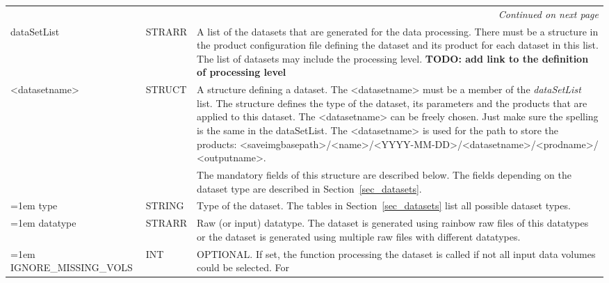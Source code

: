 \documentclass[a4paper,11pt,pdftex,twoside]{scrartcl}
\renewcommand{\bf}{\normalfont \bfseries}
\begin{document}
{{{\begin{longtable}{p{}p{}p{}}
\hline
\multicolumn{3}{r}{\textit{Continued on next page}}\\
\endfoot

\hline
\endlastfoot

dataSetList        & STRARR    & A list of the datasets that are generated for the
                                 data processing. There must be a structure in the product
                                 configuration file defining
                                 the dataset and its product for each dataset in
                                 this list. The list of datasets may include the processing level.
                                 {\bf TODO: add link to the definition of processing level}   \\
<datasetname>      & STRUCT    & A structure defining a dataset. The <datasetname> must
                                 be a member of the \emph{dataSetList} list. The structure
                                 defines the type of the dataset, its parameters and the
                                 products that are applied to this dataset.
                                 The <datasetname> can be freely chosen. Just make sure the
                                 spelling is the same in the dataSetList.
                                 The <datasetname> is used for the path to store the
                                 products:
                                 <saveimgbasepath>/<name>/<YYYY-MM-DD>/<datasetname>/<prodname>/
                                 <outputname>.\\
                   &           & The mandatory fields of this structure are described below.
                                 The fields depending on the dataset type are described in
                                 Section~\ref{sec_datasets}.\\
\hangindent=1em \hangafter=0
type               & STRING    & Type of the dataset. The tables in Section~\ref{sec_datasets} list
                                 all possible dataset types.\\
\hangindent=1em \hangafter=0
datatype           & STRARR    & Raw (or input) datatype. The dataset is generated using
                                 rainbow raw files of this datatypes or the dataset is
                                 generated using multiple raw files with different datatypes.\\
\hangindent=1em \hangafter=0
IGNORE\_\-MISSING\_VOLS & INT & OPTIONAL. If set, the function processing the dataset
                                 is called if not all input data volumes could be selected. For

\end{longtable}}}}
\end{document}
